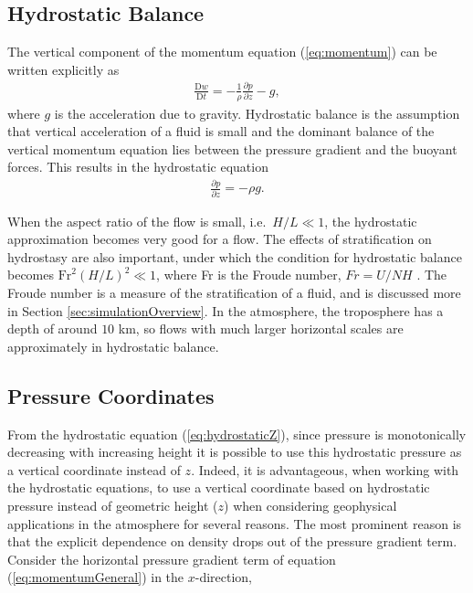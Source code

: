 \subsection{Hydrostatic Balance}
\label{sec:hydrostatic}
The vertical component of the momentum equation (\ref{eq:momentum}) can be written explicitly as
\begin{align}
\frac{\text{D} w}{\text{D} t} = -\frac{1}{\rho} \frac{\partial p}{\partial z} - g,
\end{align} 
where $g$ is the acceleration due to gravity. Hydrostatic balance is the assumption that vertical acceleration of a fluid is small and the dominant balance of the vertical momentum equation lies between the pressure gradient and the buoyant forces. This results in the hydrostatic equation 
\begin{align}
\frac{\partial p}{\partial z} = -\rho g \label{eq:hydrostaticZ}.
\end{align}

When the aspect ratio of the flow is small, i.e.\ $H/L \ll 1$, the hydrostatic approximation becomes very good for a flow. The effects of stratification on hydrostasy are also important, under which the condition for hydrostatic balance becomes $\mathrm{Fr}^2(H/L)^2 \ll 1$, where Fr is the Froude number, $Fr = U/NH$ \cite{Vallis2006}. The Froude number is a measure of the stratification of a fluid, and is discussed more in Section \ref{sec:simulationOverview}. In the atmosphere, the troposphere has a depth of around $10$ km, so flows with much larger horizontal scales are approximately in hydrostatic balance.

\subsection{Pressure Coordinates}
\label{sec:pressurecoords}
From the hydrostatic equation (\ref{eq:hydrostaticZ}), since pressure is monotonically decreasing with increasing height it is possible to use this hydrostatic pressure as a vertical coordinate instead of $z$. Indeed, it is advantageous, when working with the hydrostatic equations, to use a vertical coordinate based on hydrostatic pressure instead of geometric height ($z$) when considering geophysical applications in the atmosphere for several reasons. The most prominent reason is that the explicit dependence on density drops out of the pressure gradient term. Consider the horizontal pressure gradient term of equation (\ref{eq:momentumGeneral}) in the $x$-direction,

